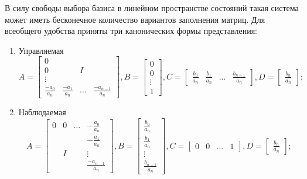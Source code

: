 \documentclass[16pt]{article}
\begin{document}
В силу свободы выбора базиса в линейном пространстве состояний такая система может иметь бесконечное количество вариантов заполнения матриц. Для всеобщего удобства приняты три канонических формы представления:
\begin{enumerate}
    \item Управляемая \\
    \[ A = \begin{bmatrix}
        0 &  &  &  \\
        0 &  & I &  \\
        \vdots &  &  &  \\
        \frac{-a_0}{a_n} & \frac{-a_1}{a_n} & \hdots & \frac{-a_{n - 1}}{a_n} 
        \end{bmatrix}, 
        B = \begin{bmatrix}
            0 \\
            0 \\
            \vdots \\
            1
            \end{bmatrix}, 
        C = \begin{bmatrix}
            \frac{b_0}{a_n} & \frac{b_1}{a_n} & \hdots & \frac{b_{n-1}}{a_n}
            \end{bmatrix}, 
        D = \begin{bmatrix}
            \frac{b_n}{a_n}
            \end{bmatrix};
    \]
    \item Наблюдаемая
    \[ A = \begin{bmatrix}
        0 & 0 & \hdots & -\frac{a_0}{a_n} \\
         &  &  &  -\frac{a_1}{a_n}\\
         & I &  &  \vdots\\
         &  &  & \frac{-a_{n - 1}}{a_n} 
        \end{bmatrix},
        B = \begin{bmatrix}
            \frac{b_0}{a_n} \\
            \frac{b_1}{a_n} \\
            \vdots \\
            \frac{b_{n-1}}{a_n}
            \end{bmatrix},
        C = \begin{bmatrix}
            0 & 0 & \hdots & 1
            \end{bmatrix},
        D = \begin{bmatrix}
            \frac{b_n}{a_n}
            \end{bmatrix};
\]
\end{enumerate}
\end{document}
